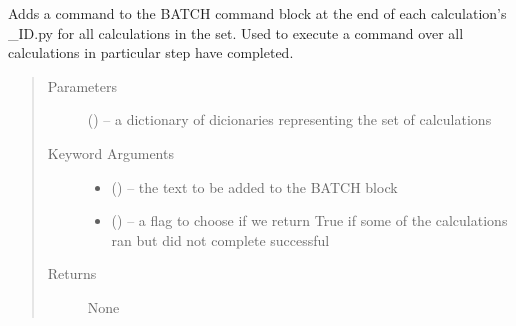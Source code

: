 \documentclass[letterpaper,10pt,english]{sphinxmanual}
\begin{document}
\begin{fulllineitems}
\label{\detokenize{prep:prep.runAfterAllDone}}
Adds a command to the BATCH command block at the end of each calculation's \_ID.py
for all calculations in the set. Used to execute a command over all calculations
in particular step have completed.
\begin{quote}\begin{description}
\item[{Parameters}] \leavevmode
{} () -- a dictionary of dicionaries representing the set of calculations

\item[{Keyword Arguments}] \leavevmode\begin{itemize}
\item {} 
 () -- the text to be added to the BATCH block

\item {} 
 () -- a flag to choose if we return True if some of the
calculations ran but did not complete successful

\end{itemize}

\item[{Returns}] \leavevmode
None

\end{description}\end{quote}

\end{fulllineitems}

\end{document}
